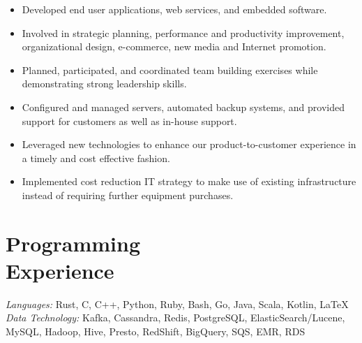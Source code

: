 \documentclass[margin,line]{resume}
\begin{document}
\begin{resume}
    \begin{itemize}
    \item Developed end user applications, web services, and embedded software.
    \item Involved in strategic planning, performance and productivity improvement, organizational design, e-commerce, new media and Internet promotion.
    \item Planned, participated, and coordinated team building exercises while demonstrating strong leadership skills.
    \item Configured and managed servers, automated backup systems, and provided support for customers as well as in-house support.
    \item Leveraged new technologies to enhance our product-to-customer experience in a timely and cost effective fashion.
    \item Implemented cost reduction IT strategy to make use of existing infrastructure instead of requiring further equipment purchases.
    \end{itemize}

    \vspace{5mm}
    
    \section{\mysidestyle Programming\\Experience}

    \emph{Languages:} Rust, C, C++, Python, Ruby, Bash, Go, Java, Scala, Kotlin, \LaTeX \\
    \emph{Data Technology:} Kafka, Cassandra, Redis, PostgreSQL, ElasticSearch/Lucene,
     MySQL, Hadoop, Hive, Presto, RedShift, BigQuery, SQS, EMR, RDS

\end{resume}
\end{document}
